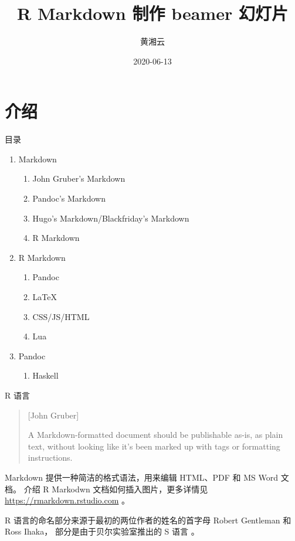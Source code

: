 \documentclass[
  ignorenonframetext,
  UTF8,fontset=adobe,zihao=false]{ctexbeamer}
\title{R Markdown 制作 beamer 幻灯片}
\author{黄湘云}
\date{2020-06-13}
\institute{中国矿业大学（北京）}
\providecommand{\tightlist}{%
  \setlength{\itemsep}{0pt}\setlength{\parskip}{0pt}}
\begin{document}
\frame{\titlepage}

\hypertarget{intro}{%
\section{介绍}\label{intro}}

\begin{frame}{目录}
\protect\hypertarget{outline}{}

\begin{enumerate}
\item
  Markdown

  \begin{enumerate}
  \tightlist
  \item
    John Gruber's Markdown
  \item
    Pandoc's Markdown
  \item
    Hugo's Markdown/Blackfriday's Markdown
  \item
    R Markdown
  \end{enumerate}
\item
  R Markdown

  \begin{enumerate}
  \tightlist
  \item
    Pandoc
  \item
    LaTeX
  \item
    CSS/JS/HTML
  \item
    Lua
  \end{enumerate}
\item
  Pandoc

  \begin{enumerate}
  \tightlist
  \item
    Haskell
  \end{enumerate}
\end{enumerate}

\end{frame}

\begin{frame}{R 语言}
\protect\hypertarget{sec:rlang}{}

\begin{quotation}[John Gruber]

A Markdown-formatted document should be publishable as-is, as plain text,
without looking like it's been marked up with tags or formatting instructions.

\end{quotation}

Markdown 提供一种简洁的格式语法，用来编辑 HTML、PDF 和 MS Word 文档。
介绍 R Markodwn 文档如何插入图片，更多详情见 \url{https://rmarkdown.rstudio.com} \citep{rmarkdown2018}。

R 语言的命名部分来源于最初的两位作者的姓名的首字母 Robert Gentleman 和 Ross Ihaka，
部分是由于贝尔实验室推出的 S 语言 \citep{base}。

\end{frame}
\end{document}
